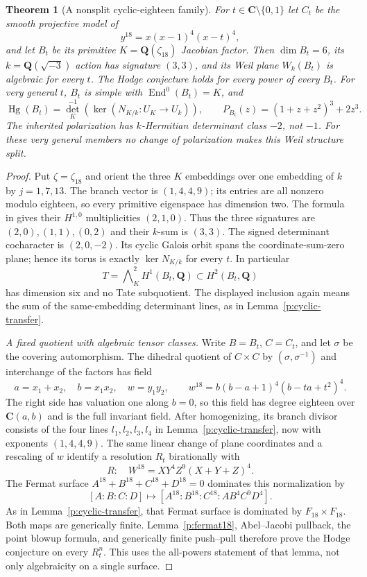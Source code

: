 \documentclass[10pt,reqno]{article}
\theoremstyle{emphasizedplain}
\newtheorem{theorem}{Theorem}[section]
\theoremstyle{emphasizeddefinition}
\theoremstyle{emphasizeddefinition}
\DeclareMathOperator{\End}{End}
\DeclareMathOperator{\Hg}{Hg}
\newcommand{\Q}{\mathbf Q}
\newcommand{\C}{\mathbf C}
\begin{document}
\begin{theorem}[A nonsplit cyclic-eighteen family]\label{p:S10cyclic18}
For $t\in\C\setminus\{0,1\}$ let $C_t$ be the smooth projective
model of
\[
 y^{18}=x(x-1)^4(x-t)^4,
\]
and let $B_t$ be its primitive $K=\Q(\zeta_{18})$ Jacobian factor.
Then $\dim B_t=6$, its $k=\Q(\sqrt{-3})$ action has signature
$(3,3)$, and its Weil plane $W_k(B_t)$ is algebraic for every $t$.
The Hodge conjecture holds for every power of every $B_t$.
For very general $t$, $B_t$ is simple with $\End^0(B_t)=K$, and
\[
 \Hg(B_t)=\det_K^{-1}(\ker(N_{K/k}:U_K\to U_k)),\qquad
 P_{B_t}(z)=(1+z+z^2)^3+2z^3.
\]
The inherited polarization has $k$-Hermitian determinant class
$-2$, not $-1$. For these very general members no change of
polarization makes this Weil structure split.
\end{theorem}
\begin{proof}
Put $\zeta=\zeta_{18}$ and orient the three $K$ embeddings over
one embedding of $k$ by $j=1,7,13$. The branch vector is
$(1,4,4,9)$; its entries are all nonzero modulo eighteen, so
every primitive eigenspace has dimension two. The formula
in \cite[Lemma 2.7]{MoonenCyclic} gives their $H^{1,0}$
multiplicities $(2,1,0)$. Thus the three signatures are
$(2,0),(1,1),(0,2)$ and their $k$-sum is $(3,3)$.
The signed determinant cocharacter is $(2,0,-2)$. Its cyclic
Galois orbit spans the coordinate-sum-zero plane; hence its
torus is exactly $\ker N_{K/k}$ for every $t$. In particular
\[
 T=\bigwedge\nolimits_K^2H^1(B_t,\Q)\subset H^2(B_t,\Q)
\]
has dimension six and no Tate subquotient. The displayed
inclusion again means the sum of the same-embedding determinant
lines, as in Lemma~\ref{p:cyclic-transfer}.

\emph{A fixed quotient with algebraic tensor classes.}
Write $B=B_t$, $C=C_t$, and let $\sigma$ be the covering automorphism.
The dihedral quotient of $C\times C$ by
$(\sigma,\sigma^{-1})$ and interchange of the factors has field
\[
 a=x_1+x_2,\quad b=x_1x_2,\quad w=y_1y_2,\qquad
 w^{18}=b(b-a+1)^4(b-ta+t^2)^4.
\]
The right side has valuation one along $b=0$, so this field has
degree eighteen over $\C(a,b)$ and is the full invariant field.
After homogenizing, its branch divisor consists of the four
lines $l_1,l_2,l_3,l_4$ in Lemma~\ref{p:cyclic-transfer}, now with
exponents $(1,4,4,9)$. The same linear change of plane coordinates
and a rescaling of $w$ identify a resolution $R_t$ birationally with
\[
 R:\quad W^{18}=XY^4Z^9(X+Y+Z)^4.
\]
The Fermat surface $A^{18}+B^{18}+C^{18}+D^{18}=0$ dominates
this normalization by
\[
 [A:B:C:D]\longmapsto[A^{18}:B^{18}:C^{18}:AB^4C^9D^4].
\]
As in Lemma~\ref{p:cyclic-transfer}, that Fermat surface is
dominated by $F_{18}\times F_{18}$. Both maps are generically
finite. Lemma~\ref{p:fermat18}, Abel--Jacobi pullback, the point
blowup formula, and generically finite push--pull therefore prove
the Hodge conjecture on every $R_t^n$. This uses the all-powers
statement of that lemma, not only algebraicity on a single surface.


\end{proof}
\end{document}
